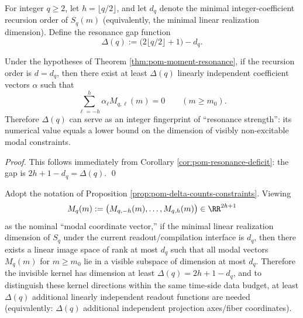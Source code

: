 \begin{definition}\label{def:pom-resonance-gap-delta}
For integer \(q\ge 2\), let \(h=\lfloor q/2\rfloor\), and let \(d_q\) denote the minimal integer-coefficient recursion order of \(S_q(m)\) (equivalently, the minimal linear realization dimension). Define the resonance gap function
$$
\Delta(q):=\bigl(2\lfloor q/2\rfloor+1\bigr)-d_q.
$$
\end{definition}

\begin{proposition}\label{prop:pom-delta-counts-constraints}
Under the hypotheses of Theorem \ref{thm:pom-moment-resonance}, if the recursion order is \(d=d_q\), then there exist at least \(\Delta(q)\) linearly independent coefficient vectors \(\alpha\) such that
\[
\sum_{\ell=-h}^{h}\alpha_\ell M_{q,\ell}(m)=0\qquad(m\ge m_0).
\]
Therefore \(\Delta(q)\) can serve as an integer fingerprint of ``resonance strength'': its numerical value equals a lower bound on the dimension of visibly non-excitable modal constraints.
\end{proposition}

\begin{proof}
This follows immediately from Corollary \ref{cor:pom-resonance-deficit}: the gap is \(2h+1-d_q=\Delta(q)\). \qed
\end{proof}

\begin{corollary}\label{cor:pom-delta-min-extra-readouts}
Adopt the notation of Proposition \ref{prop:pom-delta-counts-constraints}. Viewing
\[
M_q(m):=\bigl(M_{q,-h}(m),\ldots,M_{q,h}(m)\bigr)\in\RR^{2h+1}
\]
as the nominal ``modal coordinate vector,'' if the minimal linear realization dimension of \(S_q\) under the current readout/compilation interface is \(d_q\), then
there exists a linear image space of rank at most \(d_q\) such that all modal vectors \(M_q(m)\) for \(m\ge m_0\) lie in a visible subspace of dimension at most \(d_q\).
Therefore the invisible kernel has dimension at least
\(
\Delta(q)=2h+1-d_q
\), and to distinguish these kernel directions within the same time-side data budget, at least \(\Delta(q)\) additional linearly independent readout functions are needed
(equivalently: \(\Delta(q)\) additional independent projection axes/fiber coordinates).
\end{corollary}

